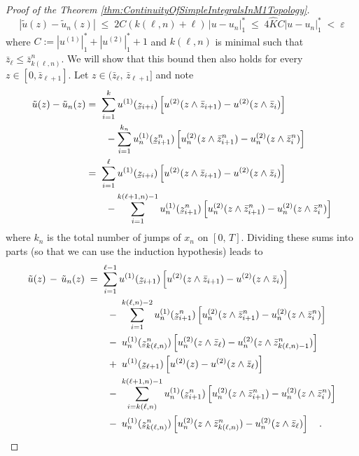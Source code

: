 \documentclass[11pt]{article}
\theoremstyle{definition}\newtheorem{example}[theorem]{Example}
\theoremstyle{definition}\newtheorem{counterexample}[theorem]{Counterexample}
\theoremstyle{definition}\newtheorem{remark}[theorem]{Remark}
\theoremstyle{definition}\newtheorem{defi}[theorem]{Definition}
\numberwithin{equation}{section}
\newcommand{\ubar}[1]{\underaccent{\bar}{#1}}
\renewcommand{\|}{\; : \, \;}											%
\begin{document}
\begin{proof}[Proof of the Theorem \ref{thm:ContinuityOfSimpleIntegralsInM1Topology}]
	$$ |\tilde{u}(z) - \tilde{u}_n(z)| \; \leq \; 2 C (k(\ell,n)+\ell) \, |u - u_n|^*_1 \; \leq \; 4 \hat{K} C |u - u_n|^*_1\; < \; \varepsilon
	$$
	where $C := |u^{(1)}|^*_1 + |u^{(2)}|_1^* + 1$ and $k(\ell,n)$ is minimal such that $\bar{z}_\ell \leq \bar{z}^n_{k(\ell,n)}$. We will show that this bound then also holds for every $z \in [0,\bar{z}_{\ell+1}]$. Let $z \in (\bar{z}_{\ell},\,\bar{z}_{\ell+1}]$ and note 
	\begin{align*}
		\tilde{u}(z) - \tilde{u}_n(z) &= \; \sum_{i=1}^{k} u^{(1)}(\ubar{z}_{i+i}) \left[u^{(2)}(z \wedge \bar{z}_{i+1}) - u^{(2)}(z \wedge \bar{z}_{i})\right]\\
		& \qquad - \sum_{i=1}^{k_n} u_n^{(1)}(\ubar{z}^n_{i+1}) \left[u_n^{(2)}(z \wedge \bar{z}^n_{i+1}) - u_n^{(2)}(z \wedge \bar{z}^n_{i})\right] \\
		&=\;  \sum_{i=1}^{\ell} u^{(1)}(\ubar{z}_{i+i})  \left[u^{(2)}(z \wedge \bar{z}_{i+1}) - u^{(2)}(z \wedge \bar{z}_{i})\right]\\
		&\qquad - \sum_{i=1}^{k(\ell+1,n) -1} u_n^{(1)}(\ubar{z}^n_{i+1})  \left[u_n^{(2)}(z \wedge \bar{z}^n_{i+1}) - u_n^{(2)}(z \wedge \bar{z}^n_{i})\right]
	\end{align*}
	where $k_n$ is the total number of jumps of $x_n$ on $[0,\,T]$. Dividing these sums into parts (so that we can use the induction hypothesis) leads to 
	\begin{align}
		\tilde{u}(z) \, - \, \tilde{u}_n(z) \; &= \; \sum_{i=1}^{\ell-1} u^{(1)}(\ubar{z}_{i+1})  \left[u^{(2)}(z \wedge \bar{z}_{i+1}) - u^{(2)}(z \wedge \bar{z}_{i})\right] \notag \\
		&\qquad  - \; \sum_{i=1}^{k(\ell,n) -2} u_n^{(1)}(\ubar{z}^n_{i+1}) \left[u_n^{(2)}(z \wedge \bar{z}^n_{i+1}) - u_n^{(2)}(z \wedge \bar{z}^n_{i})\right] \label{eq:A.1}\\    
		&\qquad - \;  u_n^{(1)}(\ubar{z}^n_{k(\ell,n)})  \left[u_n^{(2)}(z \wedge \bar{z}_{\ell}) - u_n^{(2)}(z \wedge \bar{z}^n_{k(\ell,n)-1})\right] \label{eq:A.2} \\
		&\qquad  + \; u^{(1)}(\ubar{z}_{\ell+1})  \left[u^{(2)}(z) - u^{(2)}(z \wedge \bar{z}_{\ell})\right] \notag\\
		&\qquad - \; \sum_{i=k(\ell,n)}^{k(\ell+1,n) -1} u_n^{(1)}(\ubar{z}^n_{i+1})  \left[u_n^{(2)}(z \wedge \bar{z}^n_{i+1}) - u_n^{(2)}(z \wedge \bar{z}^n_{i})\right] \notag \\
		&\qquad - \;  u_n^{(1)}(\ubar{z}^n_{k(\ell,n)})  \left[u_n^{(2)}(z \wedge \bar{z}^n_{k(\ell,n)}) - u_n^{(2)}(z \wedge \bar{z}_{\ell})\right] \quad .\notag

\end{align}
\end{proof}
\end{document}
